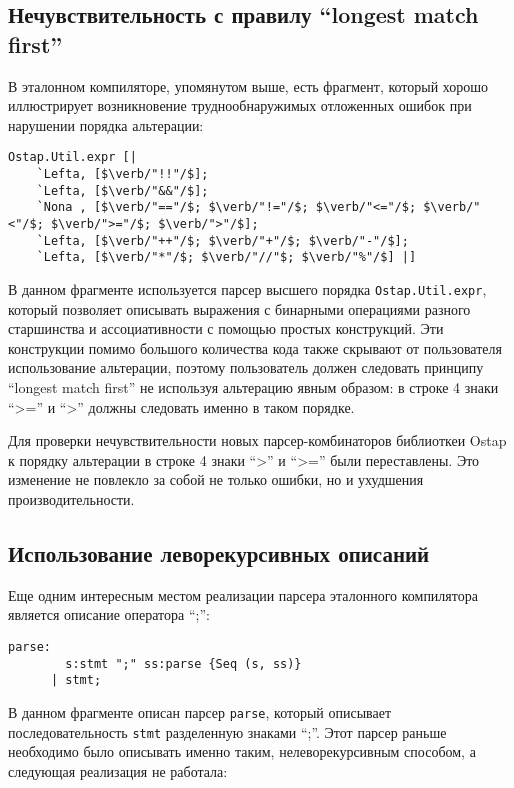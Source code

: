 \subsection{Нечувствительность с правилу ``longest match first''}

В эталонном компиляторе, упомянутом выше, есть фрагмент, который хорошо иллюстрирует возникновение труднообнаружимых отложенных ошибок при нарушении порядка альтерации:

\begin{lstlisting}[basicstyle=\small]
  Ostap.Util.expr [|
    `Lefta, [$\verb/"!!"/$];
    `Lefta, [$\verb/"&&"/$];
    `Nona , [$\verb/"=="/$; $\verb/"!="/$; $\verb/"<="/$; $\verb/"<"/$; $\verb/">="/$; $\verb/">"/$];
    `Lefta, [$\verb/"++"/$; $\verb/"+"/$; $\verb/"-"/$];
    `Lefta, [$\verb/"*"/$; $\verb/"//"$; $\verb/"%"/$] |]
\end{lstlisting}

В данном фрагменте используется парсер высшего порядка \lstinline|Ostap.Util.expr|, который позволяет описывать выражения с бинарными операциями разного старшинства и ассоциативности с помощью простых конструкций. Эти конструкции помимо большого количества кода также скрывают от пользователя использование альтерации, поэтому пользователь должен следовать принципу ``longest match first'' не используя альтерацию явным образом: в строке 4 знаки ``>='' и ``>'' должны следовать именно в таком порядке.

Для проверки нечувствительности новых парсер-комбинаторов библиоткеи Ostap к порядку альтерации в строке 4 знаки ``>'' и ``>='' были переставлены. Это изменение не повлекло за собой не только ошибки, но и ухудшения производительности.

\subsection{Использование леворекурсивных описаний}

Еще одним интересным местом реализации парсера эталонного компилятора является описание оператора ``;'':

\begin{lstlisting}[basicstyle=\small]
  parse:
        s:stmt ";" ss:parse {Seq (s, ss)}
      | stmt;
\end{lstlisting}

В данном фрагменте описан парсер \lstinline|parse|, который описывает последовательность \lstinline|stmt| разделенную знаками ``;''. Этот парсер раньше необходимо было описывать именно таким, нелеворекурсивным способом, а следующая реализация не работала:

